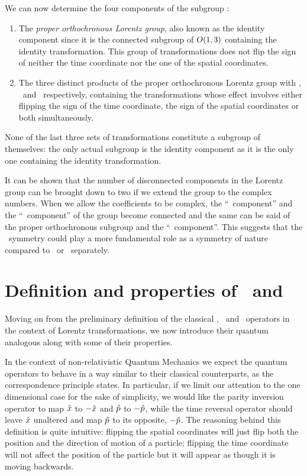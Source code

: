         We can now determine the four components of the subgroup \cite{bender2024}:
        \begin{enumerate}[label = \mybullet]
            \item The \emph{proper orthochronous Lorentz group}, also known as the identity component since it is the connected subgroup of $O\pqty{1,3}$ containing the identity transformation. This group of transformations does not flip the sign of neither the time coordinate nor the one of the spatial coordinates.
            \item The three distinct products of the proper orthochronous Lorentz group with \mcP, \mcT\ and \PT\ respectively, containing the transformations whose effect involves either flipping the sign of the time coordinate, the sign of the spatial coordinates or both simultaneously.
        \end{enumerate}
        None of the last three sets of transformations constitute a subgroup of themselves: the only actual subgroup is the identity component as it is the only one containing the identity transformation.
        
        It can be shown \cite{bender2024} that the number of disconnected components in the Lorentz group can be brought down to two if we extend the group to the complex numbers. When we allow the coefficients to be complex, the ``\mcP\ component'' and the ``\mcT\ component'' of the group become connected and the same can be said of the proper orthochronous subgroup and the ``\PT\ component''. This suggests that the \PT\ symmetry could play a more fundamental role as a symmetry of nature compared to \mcP\ or \mcT\ separately.
    
    \section{Definition and properties of \hP\ and \hT}\label{s:def-of-P-and-T}
        Moving on from the preliminary definition of the classical \mcP, \mcT\ and \PT\ operators in the context of Lorentz transformations, we now introduce their quantum analogous along with some of their properties.

        In the context of non-relativistic Quantum Mechanics we expect the quantum operators to behave in a way similar to their classical counterparts, as the correspondence principle states. In particular, if we limit our attention to the one dimensional case for the sake of simplicity, we would like the parity inversion operator to map $\hat{x}$ to $-\hat{x}$ and $\hat{p}$ to $-\hat{p}$, while the time reversal operator should leave $\hat{x}$ unaltered and map $\hat{p}$ to its opposite, $-\hat{p}$. The reasoning behind this definition is quite intuitive: flipping the spatial coordinates will just flip both the position and the direction of motion of a particle; flipping the time coordinate will not affect the position of the particle but it will appear as though it is moving backwards.

